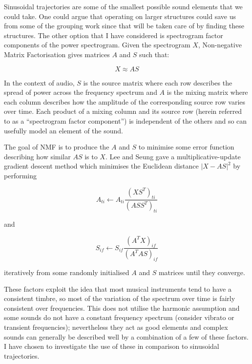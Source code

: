 \documentclass[12pt,a4paper,twoside,openright]{report}
\begin{document}
{\color{red}Sinusoidal trajectories are some of the smallest possible sound elements that we could take. One could argue that operating on larger structures could save us from some of the grouping work since that will be taken care of by finding these structures. The other option that I have considered is spectrogram factor components of the power spectrogram. Given the spectrogram $ X $, Non-negative Matrix Factorisation gives matrices $ A $ and $ S $ such that:

\begin{equation}
X \approx AS
\end{equation}

In the context of audio, $ S $ is the source matrix where each row describes the spread of power across the frequency spectrum and $ A $ is the mixing matrix where each column describes how the amplitude of the corresponding source row varies over time. Each product of a mixing column and its source row (herein referred to as a ``spectrogram factor component'') is independent of the others and so can usefully model an element of the sound.

The goal of NMF is to produce the $ A $ and $ S $ to minimise some error function describing how similar $ AS $ is to $ X $. Lee and Seung \cite{lee2001algorithms} gave a multiplicative-update gradient descent method which minimises the Euclidean distance $ \left| X - AS \right|^2 $ by performing

\begin{equation}
A_{ti} \leftarrow A_{ti} \frac{\left( X S^T \right)_{ti}}{\left( A S S^T \right)_{ti}}
\label{NMFA}
\end{equation}

and

\begin{equation}
S_{if} \leftarrow S_{if} \frac{\left( A^T X \right)_{if}}{\left( A^T A S \right)_{if}}
\label{NMFS}
\end{equation}

iteratively from some randomly initialised $ A $ and $ S $ matrices until they converge.}

These factors exploit the idea that most musical instruments tend to have a consistent timbre, so most of the variation of the spectrum over time is fairly consistent over frequencies. This does not utilise the harmonic assumption and some sounds do not have a constant frequency spectrum (consider vibrato or transient frequencies); nevertheless they act as good elements and complex sounds can generally be described well by a combination of a few of these factors. I have chosen to investigate the use of these in comparison to sinusoidal trajectories.
\end{document}
